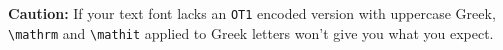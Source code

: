 \documentclass[\fsc]{article}
\theoremstyle{oldplain}
\theoremstyle{plain}
\begin{document}
\textbf{Caution:} If your text font lacks an {\tt OT1} encoded version with uppercase Greek, \verb|\mathrm| and \verb|\mathit| applied to Greek letters won't give you what you expect.
%
%
\end{document}
